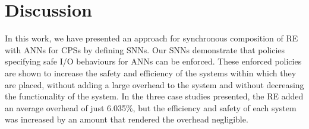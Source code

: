 \section{Discussion}
\label{sec:conclusion}

In this work, we have presented an approach for synchronous composition of \acf{RE} with \acfp{ANN} for \acp{CPS} by defining \acfp{SNN}.
Our \acp{SNN} demonstrate that policies specifying safe I/O behaviours for \acp{ANN} can be enforced.
These enforced policies are shown to increase the safety and efficiency of the systems within which they are placed, without adding a large overhead to the system and without decreasing the functionality of the system.
In the three case studies presented, the \ac{RE} added an average overhead of just 6.035\%, but the efficiency and safety of each system was increased by an amount that rendered the overhead negligible.




